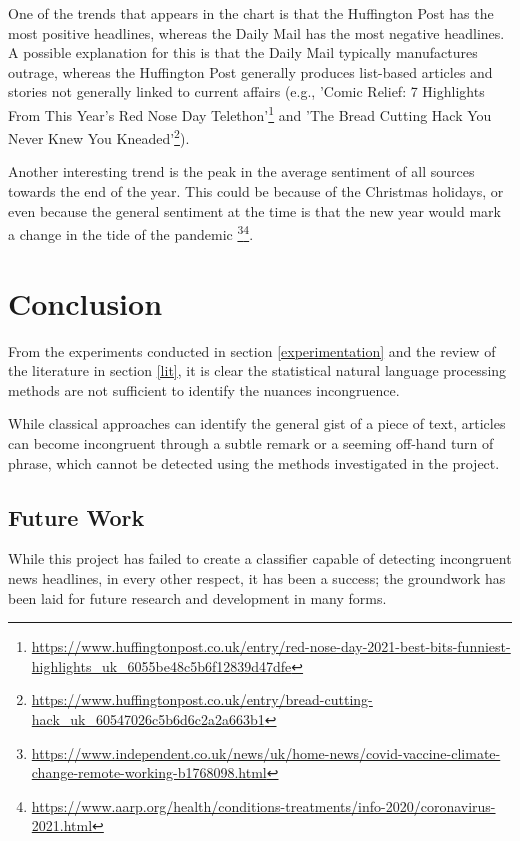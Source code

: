 One of the trends that appears in the chart is that the Huffington Post has the most positive headlines, whereas the Daily Mail has the most negative headlines. A possible explanation for this is that the Daily Mail typically manufactures outrage, whereas the Huffington Post generally produces list-based articles and stories not generally linked to current affairs (e.g., 'Comic Relief: 7 Highlights From This Year's Red Nose Day Telethon'\footnote{\url{https://www.huffingtonpost.co.uk/entry/red-nose-day-2021-best-bits-funniest-highlights_uk_6055be48c5b6f12839d47dfe}} and 'The Bread Cutting Hack You Never Knew You Kneaded'\footnote{\url{https://www.huffingtonpost.co.uk/entry/bread-cutting-hack_uk_60547026c5b6d6c2a2a663b1}}). 

Another interesting trend is the peak in the average sentiment of all sources towards the end of the year. This could be because of the Christmas holidays, or even because the general sentiment at the time is that the new year would mark a change in the tide of the pandemic \footnote{\url{https://www.independent.co.uk/news/uk/home-news/covid-vaccine-climate-change-remote-working-b1768098.html}}\footnote{\url{https://www.aarp.org/health/conditions-treatments/info-2020/coronavirus-2021.html}}.


\section{Conclusion}

From the experiments conducted in section \ref{experimentation} and the review of the literature in section \ref{lit}, it is clear the statistical natural language processing methods are not sufficient to identify the nuances incongruence. 

While classical approaches can identify the general gist of a piece of text, articles can become incongruent through a subtle remark or a seeming off-hand turn of phrase, which cannot be detected using the methods investigated in the project. 

\subsection{Future Work}

While this project has failed to create a classifier capable of detecting incongruent news headlines, in every other respect, it has been a success; the groundwork has been laid for future research and development in many forms. 

